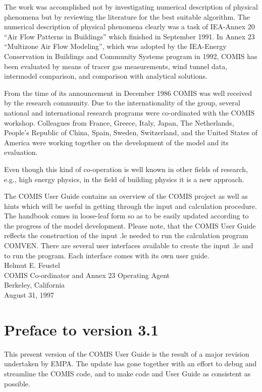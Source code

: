 \documentclass[10pt]{article}
\begin{document}
The work was accomplished not by investigating numerical description of physical phenomena but by reviewing the literature for the best suitable algorithm. The numerical description of physical phenomena clearly was a task of IEA-Annex 20 ``Air Flow Patterns in Buildings'' which finished in September 1991. In Annex 23 ``Multizone Air Flow Modeling'', which was adopted by the IEA-Energy Conservation in Buildings and Community Systems program in 1992, COMIS has been evaluated by means of tracer gas measurements, wind tunnel data, intermodel comparison, and comparison with analytical solutions. 

From the time of its announcement in December 1986 COMIS was well received by the research community. Due to the internationality of the group, several national and international research programs were co-ordinated with the COMIS workshop. Colleagues from France, Greece, Italy, Japan, The Netherlands, People's Republic of China, Spain, Sweden, Switzerland, and the United States of America were working together on the development of the model and its evaluation. 

Even though this kind of co-operation is well known in other fields of research, e.g., high energy physics, in the field of building physics it is a new approach. 

The COMIS User Guide contains an overview of the COMIS project as well as hints which will be useful in getting through the input and calculation procedure. The handbook comes in loose-leaf form so as to be easily updated according to the progress of the model development. Please note, that the COMIS User Guide reflects the construction of the input .le needed to run the calculation program COMVEN. There are several user interfaces available to create the input .le and to run the program. Each interface comes with its own user guide.
\\

Helmut E. Feustel\\
COMIS Co-ordinator and Annex 23 Operating Agent\\ 
Berkeley, California\\
August 31, 1997\\

\section{Preface to version 3.1} 
This present version of the COMIS User Guide is the result of a major revision undertaken by EMPA. The update has gone together with an effort to debug and streamline the COMIS code, and to make code and User Guide as consistent as possible. 
\end{document}
